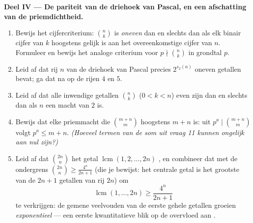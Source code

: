 \begin{problem}
\medskip
\noindent\textbf{Deel IV --- De pariteit van de driehoek van Pascal, en
een afschatting van de priemdichtheid.}
\begin{enumerate}[resume]
  \item Bewijs het cijfercriterium: $\binom nk$ is \emph{oneven} dan en
        slechts dan als elk binair cijfer van $k$ hoogstens gelijk is
        aan het overeenkomstige cijfer van $n$. Formuleer en bewijs het
        analoge criterium voor $p \nmid \binom nk$ in grondtal $p$.
  \item Leid af dat rij $n$ van de driehoek van Pascal precies
        $2^{s_2(n)}$ oneven getallen bevat; ga dat na op de rijen $4$ en
        $5$.
  \item Leid af dat alle inwendige getallen $\binom nk$ ($0 < k < n$)
        even zijn dan en slechts dan als $n$ een macht van $2$ is.
  \item Bewijs dat elke priemmacht die $\binom{m+n}m$  hoogstens $m
        + n$ is: uit $p^a \mid \binom{m+n}m$ volgt $p^a \leq m + n$.
        \emph{(Hoeveel termen van de som uit vraag 11 kunnen ongelijk
        aan nul zijn?)}
  \item Leid af dat $\binom{2n}n$ het getal $\operatorname{lcm}(1, 2,
        \dots, 2n)$ , en combineer dat met de ondergrens
        $\binom{2n}n \geq \frac{4^n}{2n+1}$ (die je bewijst: het
        centrale getal is het grootste van de $2n + 1$ getallen van rij
        $2n$) om
        \[
        \operatorname{lcm}(1, \dots, 2n) \geq \frac{4^n}{2n+1}
        \]
        te verkrijgen: de gemene veelvouden van de eerste gehele getallen
        groeien \emph{exponentieel} --- een eerste kwantitatieve blik op
        de overvloed aan .
\end{enumerate}


\end{problem}
